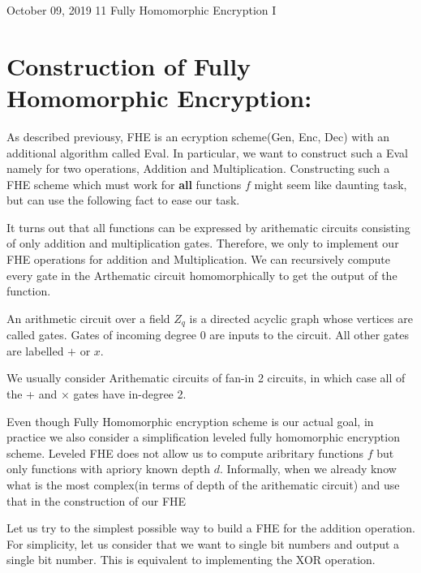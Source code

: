 \documentclass[usletter]{article}
\begin{document}
           {October 09, 2019}                          %
           {11}                                       %
           {Fully Homomorphic Encryption I}  %

\newcommand{\floor}[1]{\left\lfloor #1 \right\rfloor}
\newcommand{\ceil}[1]{\left\lceil #1 \right\rceil}

\section{Construction of Fully Homomorphic Encryption:}
As described previousy, FHE is an ecryption scheme(Gen, Enc, Dec) 
with an additional algorithm called Eval. In particular, we want to construct 
such a Eval namely for two operations, Addition and Multiplication. Constructing 
such a FHE scheme which must work for \textbf{all} functions $f$ might seem like daunting task, 
but can use the following fact to ease our task.
\begin{fact}
It turns out that all functions can be expressed by arithematic circuits consisting
of only addition and multiplication gates. Therefore, we only to implement our FHE operations for 
addition and Multiplication. We can recursively compute every gate  in the Arthematic circuit 
homomorphically to get the output of the function. 
\end{fact}

\begin{definition}
An arithmetic circuit over a field $Z_q$ is a directed
acyclic graph whose vertices are called gates. Gates of incoming degree 0 are inputs to
the circuit. All other gates are labelled $+$ or $x$. 
\end{definition}
We usually consider Arithematic circuits of fan-in 2 circuits, in which 
case all of the + and × gates have in-degree 2.

\begin{remark}
Even though Fully Homomorphic encryption scheme is our actual goal, in practice we also consider 
a simplification leveled fully homomorphic encryption scheme. Leveled FHE does not allow us to 
compute aribritary functions $f$ but only functions with apriory known depth $d$. Informally, when 
we already know what is the most complex(in terms of depth of the arithematic circuit) and use that 
in the construction of our FHE
\end{remark}

Let us try to the simplest possible way to build a FHE for the addition operation. 
For simplicity, let us consider that we want to single bit numbers 
and output a single bit number. This is equivalent to implementing the XOR operation. 
\end{document}

